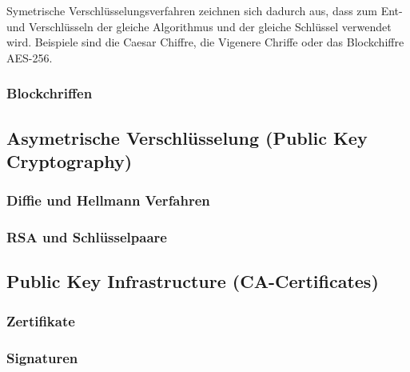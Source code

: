 Symetrische Verschlüsselungsverfahren zeichnen sich dadurch aus, dass zum
Ent- und Verschlüsseln der gleiche Algorithmus und der gleiche Schlüssel verwendet
wird. Beispiele sind die Caesar Chiffre, die Vigenere Chriffe oder das Blockchiffre AES-256.

\subsubsection{Blockchriffen}

\subsection{Asymetrische Verschlüsselung (Public Key Cryptography)}

\subsubsection{Diffie und Hellmann Verfahren}

\subsubsection{RSA und Schlüsselpaare}

\subsection{Public Key Infrastructure (CA-Certificates)}

\subsubsection{Zertifikate}

\subsubsection{Signaturen}
